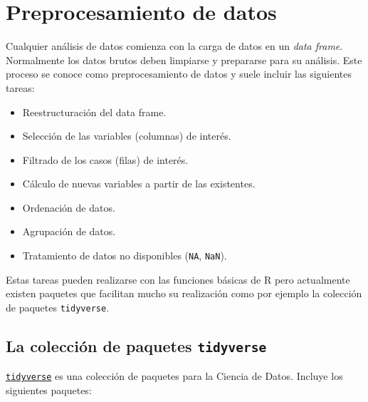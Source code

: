 \documentclass[
  a4paper,
]{scrreport}
\providecommand{\tightlist}{%
  \setlength{\itemsep}{0pt}\setlength{\parskip}{0pt}}\usepackage{longtable,booktabs,array}
\theoremstyle{definition}
\theoremstyle{definition}
\theoremstyle{remark}
\begin{document}

\chapter{Preprocesamiento de datos}\label{preprocesamiento-de-datos}

Cualquier análisis de datos comienza con la carga de datos en un
\emph{data frame}. Normalmente los datos brutos deben limpiarse y
prepararse para su análisis. Este proceso se conoce como
preprocesamiento de datos y suele incluir las siguientes tareas:

\begin{itemize}
\tightlist
\item
  Reestructuración del data frame.
\item
  Selección de las variables (columnas) de interés.
\item
  Filtrado de los casos (filas) de interés.
\item
  Cálculo de nuevas variables a partir de las existentes.
\item
  Ordenación de datos.
\item
  Agrupación de datos.
\item
  Tratamiento de datos no disponibles (\texttt{NA}, \texttt{NaN}).
\end{itemize}

Estas tareas pueden realizarse con las funciones básicas de R pero
actualmente existen paquetes que facilitan mucho su realización como por
ejemplo la colección de paquetes \texttt{tidyverse}.

\section{\texorpdfstring{La colección de paquetes
\texttt{tidyverse}}{La colección de paquetes tidyverse}}\label{la-colecciuxf3n-de-paquetes-tidyverse}

\href{https://www.tidyverse.org/}{\texttt{tidyverse}} es una colección
de paquetes para la Ciencia de Datos. Incluye los siguientes paquetes:
\end{document}
